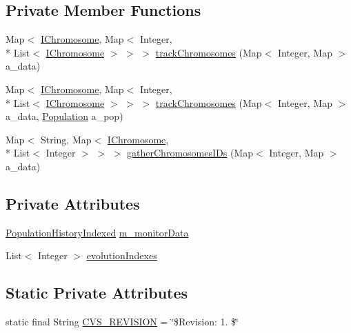 \subsection*{Private Member Functions}
\begin{DoxyCompactItemize}
\item 
Map$<$ \hyperlink{interfaceorg_1_1jgap_1_1_i_chromosome}{I\-Chromosome}, Map$<$ Integer, \\*
List$<$ \hyperlink{interfaceorg_1_1jgap_1_1_i_chromosome}{I\-Chromosome} $>$ $>$ $>$ \hyperlink{classorg_1_1jgap_1_1audit_1_1_evolution_evaluator_ac4654f0d7b2ca9f360ce0ecdb7ebfb94}{track\-Chromosomes} (Map$<$ Integer, Map $>$ a\-\_\-data)
\item 
Map$<$ \hyperlink{interfaceorg_1_1jgap_1_1_i_chromosome}{I\-Chromosome}, Map$<$ Integer, \\*
List$<$ \hyperlink{interfaceorg_1_1jgap_1_1_i_chromosome}{I\-Chromosome} $>$ $>$ $>$ \hyperlink{classorg_1_1jgap_1_1audit_1_1_evolution_evaluator_a5a2b533431aca9f07c73a2e46520a4cf}{track\-Chromosomes} (Map$<$ Integer, Map $>$ a\-\_\-data, \hyperlink{classorg_1_1jgap_1_1_population}{Population} a\-\_\-pop)
\item 
Map$<$ String, Map$<$ \hyperlink{interfaceorg_1_1jgap_1_1_i_chromosome}{I\-Chromosome}, \\*
List$<$ Integer $>$ $>$ $>$ \hyperlink{classorg_1_1jgap_1_1audit_1_1_evolution_evaluator_a33f904c1c2e7ac20bd340feef425c159}{gather\-Chromosomes\-I\-Ds} (Map$<$ Integer, Map $>$ a\-\_\-data)
\end{DoxyCompactItemize}
\subsection*{Private Attributes}
\begin{DoxyCompactItemize}
\item 
\hyperlink{classorg_1_1jgap_1_1eval_1_1_population_history_indexed}{Population\-History\-Indexed} \hyperlink{classorg_1_1jgap_1_1audit_1_1_evolution_evaluator_a5fabe529afcc7272b37aa940c9339817}{m\-\_\-monitor\-Data}
\item 
List$<$ Integer $>$ \hyperlink{classorg_1_1jgap_1_1audit_1_1_evolution_evaluator_accd4f76386641576b80ad5f2c6e94a10}{evolution\-Indexes}
\end{DoxyCompactItemize}
\subsection*{Static Private Attributes}
\begin{DoxyCompactItemize}
\item 
static final String \hyperlink{classorg_1_1jgap_1_1audit_1_1_evolution_evaluator_a3bcd75b9231b782f81ed96c2cc1dd9ef}{C\-V\-S\-\_\-\-R\-E\-V\-I\-S\-I\-O\-N} = \char`\"{}\$Revision\-: 1. \$\char`\"{}
\end{DoxyCompactItemize}


